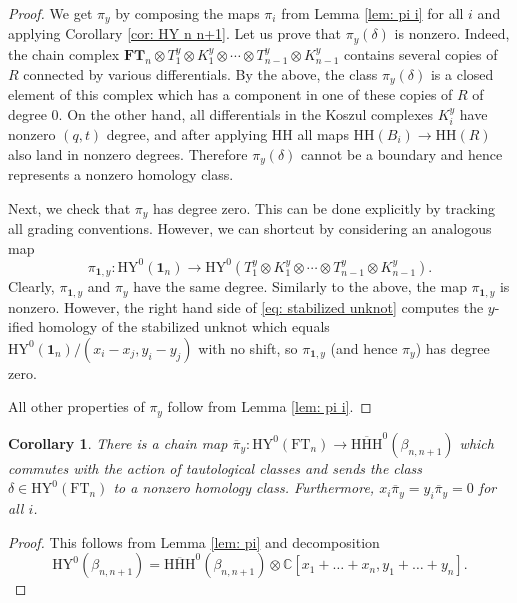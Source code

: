 \documentclass{amsart}
\newcommand{\C}{\mathbb{C}}
\newcommand{\FT}{\mathrm{FT}}
\newcommand{\HY}{\mathrm{HY}}
\newcommand{\one}{\mathbf{1}}
\newcommand{\HH}{\mathrm{HH}}
\newcommand{\HHH}{\mathrm{HHH}}
\newcommand{\bFT}{\mathbf{FT}}
\numberwithin{equation}{section}
\newtheorem{corollary}[theorem]{Corollary}
\theoremstyle{definition}
\begin{document}
\begin{proof}
We get $\pi_y$ by composing the maps $\pi_i$ from Lemma \ref{lem: pi i} for all $i$ and applying Corollary \ref{cor: HY n n+1}. Let us prove that $\pi_y(\delta)$ is nonzero. Indeed, the chain complex $\bFT_n\otimes T_1^y\otimes K_1^y\otimes \cdots \otimes T_{n-1}^y\otimes K_{n-1}^y$ contains several copies of $R$ connected by various differentials. By the above, the class $\pi_y(\delta)$ is a closed element of this complex which has a component in one of these copies of $R$ of degree $0$. On the other hand, all differentials in the Koszul complexes $K_i^y$ have nonzero $(q,t)$ degree, and after applying $\HH$ all maps $\HH(B_i)\to \HH(R)$  also land in nonzero degrees. Therefore $\pi_y(\delta)$ cannot be a boundary and hence represents a nonzero homology class.

Next, we check that $\pi_y$ has degree zero. This can be done explicitly by tracking all grading conventions. However, we can shortcut by considering an analogous map 
\begin{equation}
\label{eq: stabilized unknot}
\pi_{\one,y}:\HY^0(\one_n)\to \HY^0(T_1^y\otimes K_1^y\otimes \cdots \otimes T_{n-1}^y\otimes K_{n-1}^y).
\end{equation}
Clearly, $\pi_{\one,y}$ and $\pi_y$ have the same degree.
Similarly to the above, the map $\pi_{\one,y}$ is nonzero. However, the right hand side of \eqref{eq: stabilized unknot} computes the $y$-ified homology of the stabilized unknot which equals $\HY^0(\one_n)/(x_i-x_j,y_i-y_j)$ with no shift, so $\pi_{\one,y}$ (and hence $\pi_y$) has degree zero.

 
All other properties of $\pi_y$ follow from Lemma \ref{lem: pi i}.
\end{proof}

 

\begin{corollary}
\label{cor:pi bar}
There is a chain map $\overline{\pi}_y:\HY^0(\FT_n)\to \overline{\HHH}^0(\beta_{n,n+1})$  which commutes with the action of tautological classes and sends the class $\delta\in \HY^0(\FT_n)$ to a nonzero homology class. Furthermore,
$x_i\overline{\pi}_y=y_i\overline{\pi}_y=0$ for all $i$.
\end{corollary}

\begin{proof}
This follows from Lemma \ref{lem: pi} and decomposition
$$
\HY^0(\beta_{n,n+1})=\overline{\HHH}^0(\beta_{n,n+1})\otimes \C[x_1+\ldots+x_n,y_1+\ldots+y_n].
$$
\end{proof}
\end{document}
